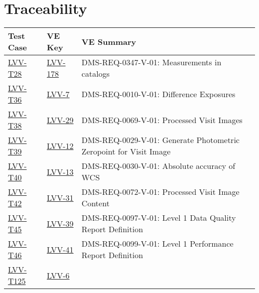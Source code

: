 \section{Traceability}

\begin{longtable}{p{3cm}p{3cm}L{9cm}}
\hline
\textbf{Test Case} & \textbf{VE Key} & \textbf{VE Summary} \\ \hline
\href{https://jira.lsstcorp.org/secure/Tests.jspa#/testCase/LVV-T28}{LVV-T28} &
  \href{https://jira.lsstcorp.org/browse/LVV-178}{LVV-178}
  & DMS-REQ-0347-V-01: Measurements in catalogs
 \\ 
\hline
\href{https://jira.lsstcorp.org/secure/Tests.jspa#/testCase/LVV-T36}{LVV-T36} &
  \href{https://jira.lsstcorp.org/browse/LVV-7}{LVV-7}
  & DMS-REQ-0010-V-01: Difference Exposures
 \\ 
\hline
\href{https://jira.lsstcorp.org/secure/Tests.jspa#/testCase/LVV-T38}{LVV-T38} &
  \href{https://jira.lsstcorp.org/browse/LVV-29}{LVV-29}
  & DMS-REQ-0069-V-01: Processed Visit Images
 \\ 
\hline
\href{https://jira.lsstcorp.org/secure/Tests.jspa#/testCase/LVV-T39}{LVV-T39} &
  \href{https://jira.lsstcorp.org/browse/LVV-12}{LVV-12}
  & DMS-REQ-0029-V-01: Generate Photometric Zeropoint for Visit Image
 \\ 
\hline
\href{https://jira.lsstcorp.org/secure/Tests.jspa#/testCase/LVV-T40}{LVV-T40} &
  \href{https://jira.lsstcorp.org/browse/LVV-13}{LVV-13}
  & DMS-REQ-0030-V-01: Absolute accuracy of WCS
 \\ 
\hline
\href{https://jira.lsstcorp.org/secure/Tests.jspa#/testCase/LVV-T42}{LVV-T42} &
  \href{https://jira.lsstcorp.org/browse/LVV-31}{LVV-31}
  & DMS-REQ-0072-V-01: Processed Visit Image Content
 \\ 
\hline
\href{https://jira.lsstcorp.org/secure/Tests.jspa#/testCase/LVV-T45}{LVV-T45} &
  \href{https://jira.lsstcorp.org/browse/LVV-39}{LVV-39}
  & DMS-REQ-0097-V-01: Level 1 Data Quality Report Definition
 \\ 
\hline
\href{https://jira.lsstcorp.org/secure/Tests.jspa#/testCase/LVV-T46}{LVV-T46} &
  \href{https://jira.lsstcorp.org/browse/LVV-41}{LVV-41}
  & DMS-REQ-0099-V-01: Level 1 Performance Report Definition
 \\ 
\hline
\href{https://jira.lsstcorp.org/secure/Tests.jspa#/testCase/LVV-T125}{LVV-T125} &
  \href{https://jira.lsstcorp.org/browse/LVV-6}{LVV-6}

\end{longtable}
